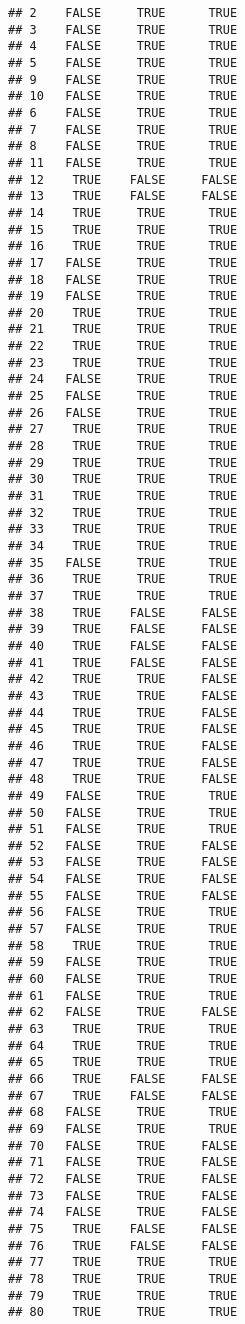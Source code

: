 \documentclass[
]{article}
\begin{document}
\begin{verbatim}
## 2    FALSE     TRUE      TRUE
## 3    FALSE     TRUE      TRUE
## 4    FALSE     TRUE      TRUE
## 5    FALSE     TRUE      TRUE
## 9    FALSE     TRUE      TRUE
## 10   FALSE     TRUE      TRUE
## 6    FALSE     TRUE      TRUE
## 7    FALSE     TRUE      TRUE
## 8    FALSE     TRUE      TRUE
## 11   FALSE     TRUE      TRUE
## 12    TRUE    FALSE     FALSE
## 13    TRUE    FALSE     FALSE
## 14    TRUE     TRUE      TRUE
## 15    TRUE     TRUE      TRUE
## 16    TRUE     TRUE      TRUE
## 17   FALSE     TRUE      TRUE
## 18   FALSE     TRUE      TRUE
## 19   FALSE     TRUE      TRUE
## 20    TRUE     TRUE      TRUE
## 21    TRUE     TRUE      TRUE
## 22    TRUE     TRUE      TRUE
## 23    TRUE     TRUE      TRUE
## 24   FALSE     TRUE      TRUE
## 25   FALSE     TRUE      TRUE
## 26   FALSE     TRUE      TRUE
## 27    TRUE     TRUE      TRUE
## 28    TRUE     TRUE      TRUE
## 29    TRUE     TRUE      TRUE
## 30    TRUE     TRUE      TRUE
## 31    TRUE     TRUE      TRUE
## 32    TRUE     TRUE      TRUE
## 33    TRUE     TRUE      TRUE
## 34    TRUE     TRUE      TRUE
## 35   FALSE     TRUE      TRUE
## 36    TRUE     TRUE      TRUE
## 37    TRUE     TRUE      TRUE
## 38    TRUE    FALSE     FALSE
## 39    TRUE    FALSE     FALSE
## 40    TRUE    FALSE     FALSE
## 41    TRUE    FALSE     FALSE
## 42    TRUE     TRUE     FALSE
## 43    TRUE     TRUE     FALSE
## 44    TRUE     TRUE     FALSE
## 45    TRUE     TRUE     FALSE
## 46    TRUE     TRUE     FALSE
## 47    TRUE     TRUE     FALSE
## 48    TRUE     TRUE     FALSE
## 49   FALSE     TRUE      TRUE
## 50   FALSE     TRUE      TRUE
## 51   FALSE     TRUE      TRUE
## 52   FALSE     TRUE     FALSE
## 53   FALSE     TRUE     FALSE
## 54   FALSE     TRUE     FALSE
## 55   FALSE     TRUE     FALSE
## 56   FALSE     TRUE      TRUE
## 57   FALSE     TRUE      TRUE
## 58    TRUE     TRUE      TRUE
## 59   FALSE     TRUE      TRUE
## 60   FALSE     TRUE      TRUE
## 61   FALSE     TRUE      TRUE
## 62   FALSE     TRUE     FALSE
## 63    TRUE     TRUE      TRUE
## 64    TRUE     TRUE      TRUE
## 65    TRUE     TRUE      TRUE
## 66    TRUE    FALSE     FALSE
## 67    TRUE    FALSE     FALSE
## 68   FALSE     TRUE      TRUE
## 69   FALSE     TRUE      TRUE
## 70   FALSE     TRUE     FALSE
## 71   FALSE     TRUE     FALSE
## 72   FALSE     TRUE     FALSE
## 73   FALSE     TRUE     FALSE
## 74   FALSE     TRUE     FALSE
## 75    TRUE    FALSE     FALSE
## 76    TRUE    FALSE     FALSE
## 77    TRUE     TRUE      TRUE
## 78    TRUE     TRUE      TRUE
## 79    TRUE     TRUE      TRUE
## 80    TRUE     TRUE      TRUE

\end{verbatim}
\end{document}
